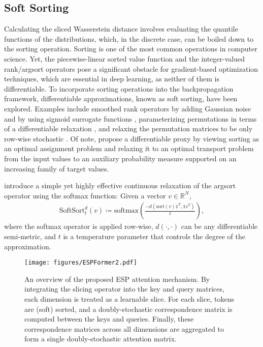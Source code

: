 \subsection{Soft Sorting}
Calculating the sliced Wasserstein distance involves evaluating the quantile functions of the distributions, which, in the discrete case, can be boiled down to the sorting operation. Sorting is one of the most common operations in computer science. Yet, the piecewise-linear sorted value function and the integer-valued rank/argsort operators pose a significant obstacle for gradient-based optimization techniques, which are essential in deep learning, as neither of them is differentiable. To incorporate sorting operations into the backpropagation framework, differentiable approximations, known as soft sorting, have been explored. Examples include smoothed rank operators by adding Gaussian noise \cite{taylor2008softrank} and by using sigmoid surrogate functions \cite{qin2010general}, parameterizing permutations in terms of a differentiable relaxation 
 \cite{mena2018learning}, and relaxing the permutation matrices to be only row-wise stochastic \cite{grover2019stochastic}.  Of note, \citet{NEURIPS2019_d8c24ca8} propose a differentiable proxy by viewing sorting as an optimal assignment problem and relaxing it to an optimal transport problem from the input values to an auxiliary probability measure supported on an increasing family of target values. 

\citet{prillo2020softsort} introduce a simple yet highly effective continuous relaxation of the argsort operator using the softmax function: Given a vector $v\in\mathbb{R}^N$,
\begin{align}
    \text{SoftSort}_t^d(v) \coloneqq \text{softmax}\left(\frac{-d(\text{sort}(v)\mathds{1}^T, \mathds{1}v^T)}{t}\right),
    \label{eq:softsort}
\end{align}
where the softmax operator is applied row-wise, $d(\cdot, \cdot)$ can be any differentiable semi-metric, and $t$ is a temperature parameter that controls the degree of the approximation. 

\begin{figure*}[t!]
    \centering
    \texttt{[image: figures/ESPFormer2.pdf]}
    \vspace{-.15in}
    \caption{An overview of the proposed ESP attention mechanism. By integrating the slicing operator into the key and query matrices, each dimension is treated as a learnable slice. For each slice, tokens are (soft) sorted, and a doubly-stochastic correspondence matrix is computed between the keys and queries. Finally, these correspondence matrices across all dimensions are aggregated to form a single doubly-stochastic attention matrix.}
    \label{fig:teaser}
    \vspace{-.2in}
\end{figure*}